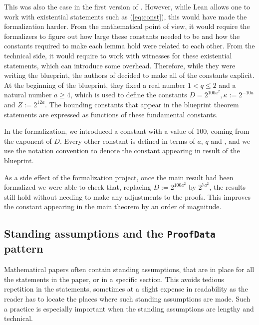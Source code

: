 \documentclass[12pt]{amsart}
\theoremstyle{definition}
\theoremstyle{plain}
\begin{document}
This was also the case in the first version of \cite{ThieleCarlesonPreprint}. However, while Lean allows one to work with existential statements such as (\ref{eq:const}), this would have made the formalization harder. From the mathematical point of view, it would require the formalizers to figure out how large these constants needed to be and how the constants required to make each lemma hold were related to each other. From the technical side, it would require to work with witnesses for these existential statements, which can introduce some overhead.
Therefore, while they were writing the blueprint, the authors of \cite{ThieleCarlesonPreprint} decided to make all of the constants explicit. At the beginning of the blueprint, they fixed a real number $1 < q \le 2$ and a natural number $a \ge 4$, which is used to define the constants $D = 2^{100a^2}, \kappa := 2 ^{-10a}$ and $Z := 2^{12a}$. The bounding constants that appear in the blueprint theorem statements are expressed as functions of these fundamental constants.

In the formalization, we introduced a constant  with a value of 100, coming from the exponent of $D$.
Every other constant is defined in terms of $a$, $q$ and , and we use the notation convention  to denote the constant appearing in result  of the blueprint.

As a side effect of the formalization project, once the main result had been formalized we were able to check that, replacing $D := 2^{100a^2}$ by $2^{7a^2}$, the results still hold without needing to make any adjustments to the proofs. This improves the constant appearing in the main theorem by an order of magnitude.


\subsection{Standing assumptions and the \texttt{ProofData} pattern}\label{subsec:proof_data}

Mathematical papers often contain standing assumptions, that are in place for
all the statements in the paper, or in a specific section. This avoids
tedious repetition in the statements, sometimes at a slight expense in
readability as the reader has to locate the places where such standing
assumptions are made. Such a practice is especially important when the
standing assumptions are lengthy and technical.
\end{document}
